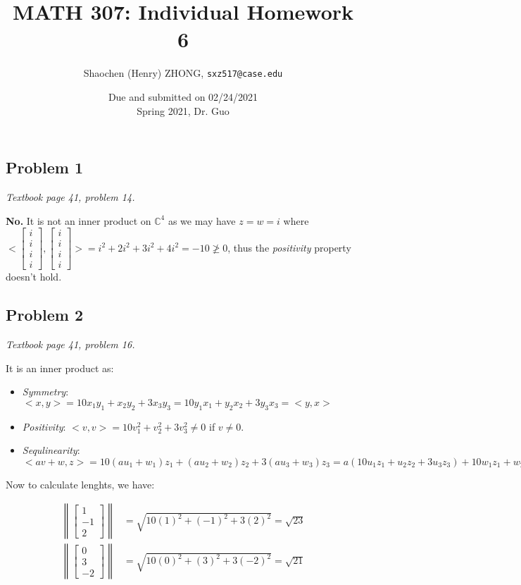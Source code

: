 \documentclass[11pt]{article}
\newcommand{\ilc}{\texttt}
\providecommand{\qbm}[1]{\begin{bmatrix} #1 \end{bmatrix}}
\providecommand{\norm}[1]{\left\lVert #1 \right\rVert}
\begin{document}
\title{\textbf{MATH 307: Individual Homework 6}}


\author{Shaochen (Henry) ZHONG, \ilc{sxz517@case.edu}}

\date{Due and submitted on 02/24/2021 \\ Spring 2021, Dr. Guo}
\maketitle

\subsection*{Problem 1}
\textit{Textbook page 41, problem 14.}\newline

\textbf{No.} It is not an inner product on $\mathbb{C}^4$ as we may have $z = w = i$ where $<\qbm{i \\ i \\ i \\i}, \qbm{i \\ i \\ i \\i}> = i^2 + 2i^2 + 3 i^2 + 4 i^2 = -10 \not\geq 0$, thus the \textit{positivity} property doesn't hold.

\subsection*{Problem 2}
\textit{Textbook page 41, problem 16.}\newline

It is an inner product as:
\begin{itemize}
    \item \textit{Symmetry}: $<x, y> = 10 x_1 y_1 + x_2 y_2 + 3 x_3 y_3 =  10 y_1 x_1 + y_2 x_2 + 3 y_3 x_3 = <y, x>$
    \item \textit{Positivity}: $<v, v> = 10v_1^2 + v_2^2 + 3 v_3^2 \neq 0$ if $v \neq 0$.
    \item \textit{Sequlinearity}: $<av + w, z> = 10(au_1 + w_1)z_1 + (au_2 + w_2)z_2 + 3(au_3 + w_3)z_3 = a(10u_1 z_1 + u_2 z_2 + 3 u_3 z_3) + 10w_1 z_1 + w_2 z_2 + 3 w_3 z_3 = a<u, z> + <w, z>$
\end{itemize}

Now to calculate lenghts, we have:

\begin{align*}
    \norm{\qbm{1 \\ -1 \\ 2}} &= \sqrt{10(1)^2 + (-1)^2 + 3(2)^2} = \sqrt{23} \\
    \norm{\qbm{0 \\ 3 \\ -2}} &= \sqrt{10(0)^2 + (3)^2 + 3(-2)^2} = \sqrt{21}
\end{align*}
\end{document}
